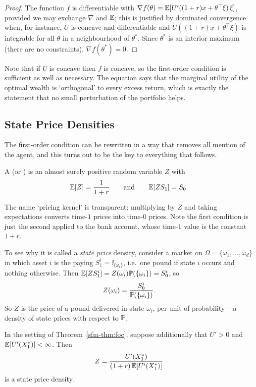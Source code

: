 \documentclass[a4paper]{scrartcl}
\begin{document}
\begin{proof}
	The function $f$ is differentiable with $\nabla f(\theta) = \mathbb{E}[U'((1+r)x + \theta^\top\xi)\,\xi]$, provided we may exchange $\nabla$ and $\mathbb{E}$; this is justified by dominated convergence when, for instance, $U$ is concave and differentiable and $U((1+r)x + \theta^\top \xi)$ is integrable for all $\theta$ in a neighbourhood of $\theta^*$. Since $\theta^*$ is an interior maximum (there are no constraints), $\nabla f(\theta^*) = 0$.
\end{proof}

Note that if $U$ is concave then $f$ is concave, so the first-order condition is sufficient as well as necessary. The equation says that the marginal utility of the optimal wealth is `orthogonal' to every excess return, which is exactly the statement that no small perturbation of the portfolio helps.

\subsection{State Price Densities}

The first-order condition can be rewritten in a way that removes all mention of the agent, and this turns out to be the key to everything that follows.

\begin{definition}
	A  (or ) is an almost surely positive random variable $Z$ with
	$$
	\mathbb{E}[Z] = \frac{1}{1+r} \qquad \text{and} \qquad \mathbb{E}[Z S_1] = S_0.
	$$
\end{definition}

The name `pricing kernel' is transparent: multiplying by $Z$ and taking expectations converts time-$1$ prices into time-$0$ prices. Note the first condition is just the second applied to the bank account, whose time-$1$ value is the constant $1 + r$.

To see why it is called a \emph{state price} density, consider a market on $\Omega = \{\omega_1,\dots,\omega_d\}$ in which asset $i$ is the  paying $S_1^i = \ii_{\{\omega_i\}}$, i.e.\ one pound if state $i$ occurs and nothing otherwise. Then $\mathbb{E}[ZS_1^i] = Z(\omega_i)\mathbb{P}(\{\omega_i\}) = S_0^i$, so
$$
Z(\omega_i) = \frac{S_0^i}{\mathbb{P}(\{\omega_i\})}.
$$
So $Z$ is the price of a pound delivered in state $\omega_i$, per unit of probability -- a density of state prices with respect to $\mathbb{P}$.

\begin{theorem}\label{thm:spd-from-utility}
	In the setting of Theorem~\ref{sfm-thm:foc}, suppose additionally that $U' > 0$ and $\mathbb{E}[U'(X_1^*)] < \infty$. Then
	$$
	Z = \frac{U'(X_1^*)}{(1+r)\,\mathbb{E}[U'(X_1^*)]}
	$$
	is a state price density.
\end{theorem}
\end{document}
